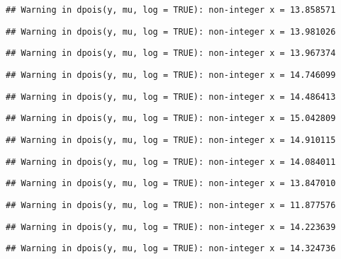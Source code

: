 \documentclass[
]{article}
\begin{document}
\begin{verbatim}
## Warning in dpois(y, mu, log = TRUE): non-integer x = 13.858571
\end{verbatim}

\begin{verbatim}
## Warning in dpois(y, mu, log = TRUE): non-integer x = 13.981026
\end{verbatim}

\begin{verbatim}
## Warning in dpois(y, mu, log = TRUE): non-integer x = 13.967374
\end{verbatim}

\begin{verbatim}
## Warning in dpois(y, mu, log = TRUE): non-integer x = 14.746099
\end{verbatim}

\begin{verbatim}
## Warning in dpois(y, mu, log = TRUE): non-integer x = 14.486413
\end{verbatim}

\begin{verbatim}
## Warning in dpois(y, mu, log = TRUE): non-integer x = 15.042809
\end{verbatim}

\begin{verbatim}
## Warning in dpois(y, mu, log = TRUE): non-integer x = 14.910115
\end{verbatim}

\begin{verbatim}
## Warning in dpois(y, mu, log = TRUE): non-integer x = 14.084011
\end{verbatim}

\begin{verbatim}
## Warning in dpois(y, mu, log = TRUE): non-integer x = 13.847010
\end{verbatim}

\begin{verbatim}
## Warning in dpois(y, mu, log = TRUE): non-integer x = 11.877576
\end{verbatim}

\begin{verbatim}
## Warning in dpois(y, mu, log = TRUE): non-integer x = 14.223639
\end{verbatim}

\begin{verbatim}
## Warning in dpois(y, mu, log = TRUE): non-integer x = 14.324736
\end{verbatim}
\end{document}
